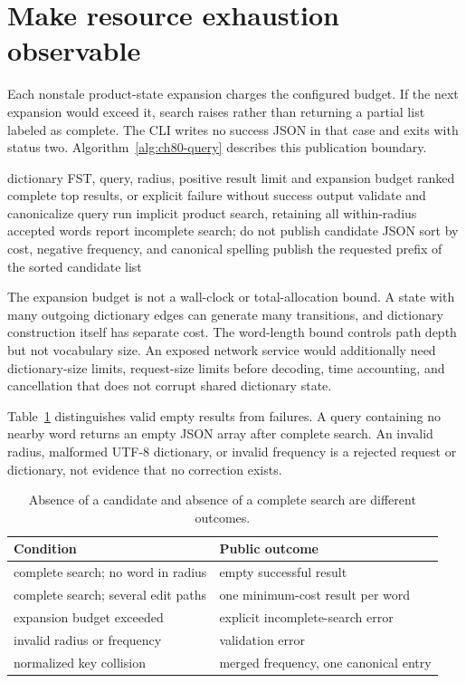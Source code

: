 \section{Make resource exhaustion observable}
\label{sec:ch80-budget}
Each nonstale product-state expansion charges the configured budget.
If the next expansion would exceed it, search raises  rather than returning a partial list labeled as complete.
The CLI writes no success JSON in that case and exits with status two.
Algorithm~\ref{alg:ch80-query} describes this publication boundary.

\begin{algorithm}[htbp]
\caption{Publish spellchecking results only after complete bounded search.}
\label{alg:ch80-query}
\begin{pseudocode}
\Require dictionary FST, query, radius, positive result limit and expansion budget
\Ensure ranked complete top results, or explicit failure without success output
\State validate and canonicalize query
\State run implicit product search, retaining all within-radius accepted words
\State report incomplete search; do not publish candidate JSON
\EndIf
\State sort by cost, negative frequency, and canonical spelling
\State publish the requested prefix of the sorted candidate list
\end{pseudocode}
\end{algorithm}

The expansion budget is not a wall-clock or total-allocation bound.
A state with many outgoing dictionary edges can generate many transitions, and dictionary construction itself has separate cost.
The word-length bound controls path depth but not vocabulary size.
An exposed network service would additionally need dictionary-size limits, request-size limits before decoding, time accounting, and cancellation that does not corrupt shared dictionary state.

Table~\ref{tab:ch80-failures} distinguishes valid empty results from failures.
A query containing no nearby word returns an empty JSON array after complete search.
An invalid radius, malformed UTF-8 dictionary, or invalid frequency is a rejected request or dictionary, not evidence that no correction exists.

\begin{table}[htbp]
\caption{Absence of a candidate and absence of a complete search are different outcomes.}
\label{tab:ch80-failures}
\centering
\begin{tabular}{ll}
\toprule
Condition & Public outcome \\
\midrule
complete search; no word in radius & empty successful result \\
complete search; several edit paths & one minimum-cost result per word \\
expansion budget exceeded & explicit incomplete-search error \\
invalid radius or frequency & validation error \\
normalized key collision & merged frequency, one canonical entry \\
\bottomrule
\end{tabular}
\end{table}

